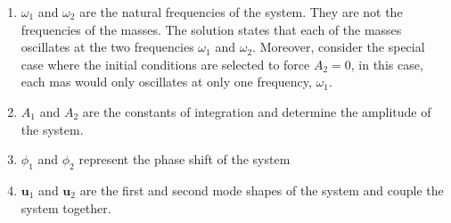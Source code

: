 \documentclass[12pt,letter]{article}
\numberwithin{ex}{section} %
\numberwithin{re}{section} %
\begin{document}
\begin{enumerate}
\item $\omega_1$ and $\omega_2$ are the natural frequencies of the system. They are not the frequencies of the masses. The solution states that each of the masses oscillates at the two frequencies $\omega_1$ and $\omega_2$. Moreover, consider the special case where the initial conditions are selected to force $A_2 = 0$, in this case, each mas would only oscillates at only one frequency, $\omega_1$.
\item $A_1$ and $A_2$ are the constants of integration and determine the amplitude of the system.
\item $\phi_1$ and $\phi_2$ represent the phase shift of the system
\item $\mathbf{u}_1$ and $\mathbf{u}_2$ are the first and second mode shapes of the system and couple the system together.
\end{enumerate}
\end{document}
